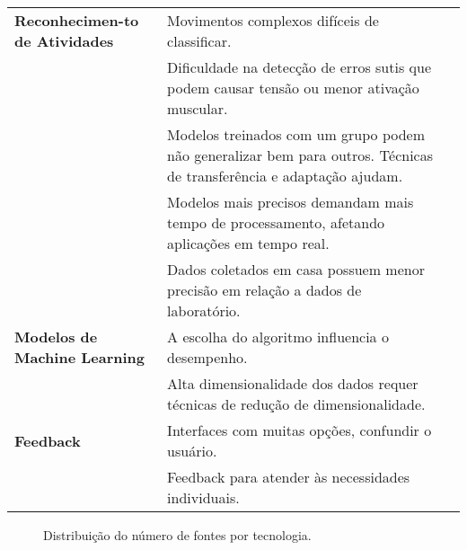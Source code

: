 \documentclass[a4paper,12pt]{article}
\begin{document}
\begin{longtable}{|p{3cm}|p{6cm}|p{3.4cm}|}
\textbf{Reconhecimen-to de Atividades} & Movimentos complexos difíceis de classificar. & \cite{Johnson2021, Tian2021, Simon2023, MallolRagolta2021, Akpa2018, Zou2020, Kwon2021} \\ \cline{2-3}
& Dificuldade na detecção de erros sutis que podem causar tensão ou menor ativação muscular. & \cite{Johnson2021, papadopoulou2023towards, Hussain2024, Zou2020, Zhang2018, Koskimaki2014, Michaud2021, } \\ \cline{2-3}
& Modelos treinados com um grupo podem não generalizar bem para outros. Técnicas de transferência e adaptação ajudam. & \\ \cline{2-3}
& Modelos mais precisos demandam mais tempo de processamento, afetando aplicações em tempo real. & \\ \cline{2-3}
& Dados coletados em casa possuem menor precisão em relação a dados de laboratório. & \\ \hline

\textbf{Modelos de Machine Learning} & A escolha do algoritmo influencia o desempenho. & \\ \cline{2-3}
& Alta dimensionalidade dos dados requer técnicas de redução de dimensionalidade. & \\ \hline

\textbf{Feedback} & Interfaces com muitas opções, confundir o usuário. & \\ \cline{2-3}
& Feedback para atender às necessidades individuais. & \\ \hline

\end{longtable}

\pgfplotsset{compat=1.17}

\begin{figure}[ht]
    \centering
    \caption{Distribuição do número de fontes por tecnologia.}
    \label{fig:tecnologias}
\end{figure}
\end{document}

